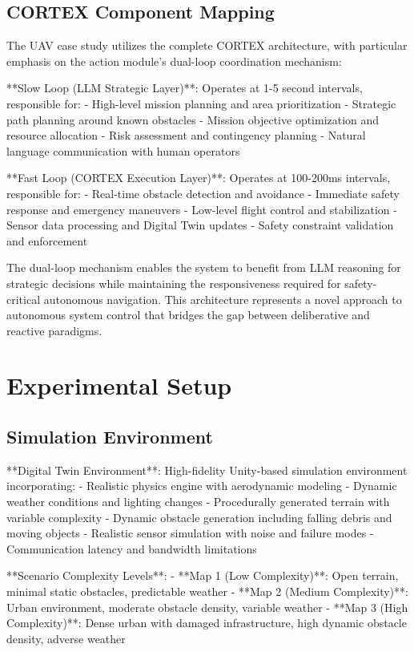 \subsection{CORTEX Component Mapping}

The UAV case study utilizes the complete CORTEX architecture, with particular emphasis on the action module's dual-loop coordination mechanism:

**Slow Loop (LLM Strategic Layer)**: Operates at 1-5 second intervals, responsible for:
- High-level mission planning and area prioritization
- Strategic path planning around known obstacles
- Mission objective optimization and resource allocation
- Risk assessment and contingency planning
- Natural language communication with human operators

**Fast Loop (CORTEX Execution Layer)**: Operates at 100-200ms intervals, responsible for:
- Real-time obstacle detection and avoidance
- Immediate safety response and emergency maneuvers
- Low-level flight control and stabilization
- Sensor data processing and Digital Twin updates
- Safety constraint validation and enforcement

The dual-loop mechanism enables the system to benefit from LLM reasoning for strategic decisions while maintaining the responsiveness required for safety-critical autonomous navigation. This architecture represents a novel approach to autonomous system control that bridges the gap between deliberative and reactive paradigms.

\section{Experimental Setup}

\subsection{Simulation Environment}

**Digital Twin Environment**: High-fidelity Unity-based simulation environment incorporating:
- Realistic physics engine with aerodynamic modeling
- Dynamic weather conditions and lighting changes
- Procedurally generated terrain with variable complexity
- Dynamic obstacle generation including falling debris and moving objects
- Realistic sensor simulation with noise and failure modes
- Communication latency and bandwidth limitations

**Scenario Complexity Levels**:
- **Map 1 (Low Complexity)**: Open terrain, minimal static obstacles, predictable weather
- **Map 2 (Medium Complexity)**: Urban environment, moderate obstacle density, variable weather
- **Map 3 (High Complexity)**: Dense urban with damaged infrastructure, high dynamic obstacle density, adverse weather

